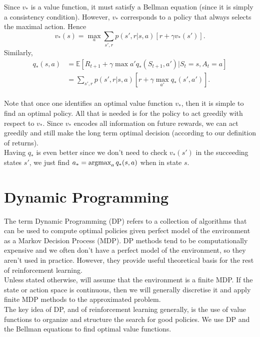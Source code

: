 Since $v_*$ is a value function, it must satisfy a Bellman equation (since it is simply a consistency condition). However, $v_*$ corresponds to a policy that always selects the maximal action. Hence 
\begin{equation}
    v_*(s) = \max_a \sum_{s', r} p(s', r|s, a) [r + \gamma v_*(s')].
\end{equation}
Similarly,
\begin{align}
    q_*(s, a) &= \mathbb{E} [R_{t+1} + \gamma \max{a'}q_*(S_{t+1}, a') | S_t=s, A_t = a]\\
              &= \sum_{s', r} p(s', r| s, a ) [r + \gamma \max_{a'}q_*(s', a')].
\end{align} \\

Note that once one identifies an optimal value function $v_*$, then it is simple to find an optimal policy. All that is needed is for the policy to act greedily with respect to $v_*$. Since $v_*$ encodes all information on future rewards, we can act greedily and still make the long term optimal decision (according to our definition of returns).\\

Having $q_*$ is even better since we don't need to check $v_*(s')$ in the succeeding states $s'$, we just find $a_* = \operatorname*{argmax}_a q_*(s, a)$ when in state $s$.

\clearpage
\section{Dynamic Programming}

The term Dynamic Programming (DP) refers to a collection of algorithms that can be used to compute optimal policies given perfect model of the environment as a Markov Decision Process (MDP). DP methods tend to be computationally expensive and we often don't have a perfect model of the environment, so they aren't used in practice. However, they provide useful theoretical basis for the rest of reinforcement learning. \\

Unless stated otherwise, will assume that the environment is a finite MDP. If the state or action space is continuous, then we will generally discretise it and apply finite MDP methods to the approximated problem.\\

The key idea of DP, and of reinforcement learning generally, is the use of value functions to organize and structure the search for good policies. We use DP and the Bellman equations to find optimal value functions. 

